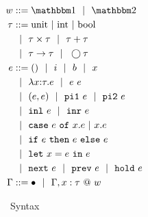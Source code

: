 %


\begin{figure}
\caption{\lamStaged~Syntax}
\label{fig:lamStagedSyntax}
\centering
$\begin{aligned}
\world &::= \bbone \gbar \bbtwo \\
\type &::= \text{unit}~|~\text{int}~|~\text{bool} \\
&\gbar \type \times \type 
 \gbar \type + \type \\
&\gbar \type \to \type 
 \gbar \fut \type \\
\expr &::= ()\gbar\inte\gbar\bool\gbar \var  \\
&\gbar \lam{\var}{\type}{\expr} 
 \gbar \expr~\expr \\
&\gbar (\expr, \expr) 
 \gbar \pio~\expr 
 \gbar \pit~\expr \\
&\gbar \inl~\expr 
 \gbar \inr~\expr \\
&\gbar \caseof {\expr}{\var.\expr}{\var.\expr} \\
&\gbar \ifthen {\expr}{\expr}{\expr} \\
&\gbar \letin{\var}{\expr}{\expr} \\
&\gbar \next~\expr 
 \gbar \prev~\expr 
 \gbar \pause~\expr \\
\context &::=\emptyC \gbar \context, \colwor \var \type
\end{aligned} $
\end{figure}